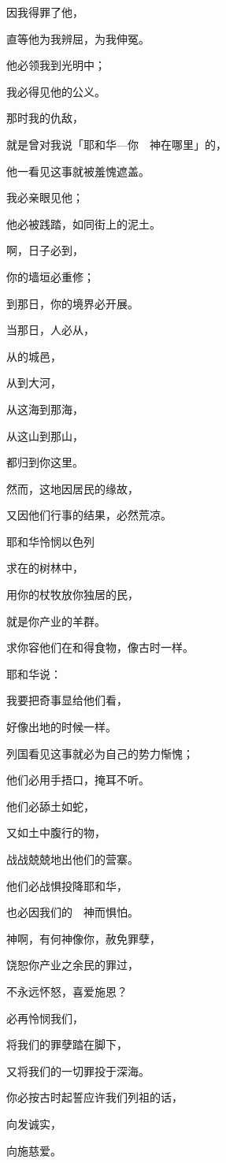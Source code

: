 {\par }{\Q 因我得罪了他，
\par }{\Q 直等他为我辨屈，为我伸冤。
\par }{\Q 他必领我到光明中；
\par }{\Q 我必得见他的公义。
\par }{\Q {}那时我的仇敌，
\par }{\Q 就是曾对我说「耶和华—你　神在哪里」的，
\par }{\Q 他一看见这事就被羞愧遮盖。
\par }{\Q 我必亲眼见他{}；
\par }{\Q 他必被践踏，如同街上的泥土。
\par }{\BB \par }{\Q {}啊，日子必到，
\par }{\Q 你的墙垣必重修；
\par }{\Q 到那日，你的境界必开展。
\par }{\Q {}当那日，人必从{}，
\par }{\Q 从{}的城邑，
\par }{\Q 从{}到大河，
\par }{\Q 从这海到那海，
\par }{\Q 从这山到那山，
\par }{\Q 都归到你这里。
\par }{\Q {}然而，这地因居民的缘故，
\par }{\Q 又因他们行事的结果，必然荒凉。
\par }{\SH 耶和华怜悯以色列
\par }{\Q {}求{}在{}的树林中，
\par }{\Q 用你的杖牧放你独居的民，
\par }{\Q 就是你产业的羊群。
\par }{\Q 求你容他们在{}和{}得食物，像古时一样。
\par }{\BB \par }{\Q {}耶和华说：
\par }{\Q 我要把奇事显给他们看，
\par }{\Q 好像出{}地的时候一样。
\par }{\Q {}列国看见这事就必为自己的势力惭愧；
\par }{\Q 他们必用手捂口，掩耳不听。
\par }{\Q {}他们必舔土如蛇，
\par }{\Q 又如土中腹行的物，
\par }{\Q 战战兢兢地出他们的营寨。
\par }{\Q 他们必战惧投降耶和华，
\par }{\Q 也必因我们的　神而惧怕。
\par }{\BB \par }{\Q {}神啊，有何神像你，赦免罪孽，
\par }{\Q 饶恕你产业之余民的罪过，
\par }{\Q 不永远怀怒，喜爱施恩？
\par }{\Q {}必再怜悯我们，
\par }{\Q 将我们的罪孽踏在脚下，
\par }{\Q 又将我们的一切罪投于深海。
\par }{\Q {}你必按古时起誓应许我们列祖的话，
\par }{\Q 向{}发诚实，
\par }{\Q 向{}施慈爱。
\par }